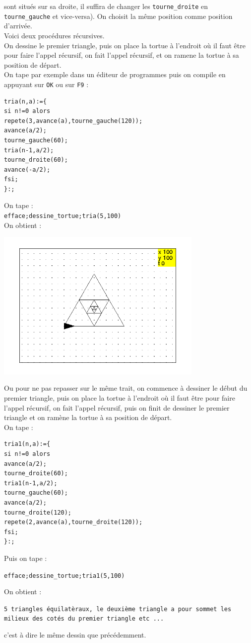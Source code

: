 \documentclass[a4paper,11pt]{book}
\begin{document}
sont situ\'es sur sa droite, il suffira de changer les {\tt tourne\_droite} en
{\tt tourne\_gauche} et vice-versa). On choisit la m\^eme position comme 
position d'arriv\'ee.\\
Voici deux proc\'edures r\'ecursives.\\
On dessine le premier triangle, puis on place la tortue \`a l'endroit o\`u il
faut \^etre pour faire l'appel r\'ecursif, on fait l'appel r\'ecursif,
et on ramene la tortue \`a sa position de d\'epart.\\
On tape par exemple dans un \'editeur de programmes puis on compile en appuyant
sur {\tt OK} ou sur {\tt F9} :
\begin{verbatim}
tria(n,a):={
si n!=0 alors 
repete(3,avance(a),tourne_gauche(120));
avance(a/2);
tourne_gauche(60);
tria(n-1,a/2);
tourne_droite(60);
avance(-a/2);
fsi;
}:;
\end{verbatim}
On tape :\\
{\tt efface;dessine\_tortue;tria(5,100)}\\
On obtient :
\begin{center}\includegraphics[width=10cm]{tortuet}\end{center}

Ou pour ne pas repasser sur le m\^eme trait, on commence \`a dessiner le 
d\'ebut du premier triangle, puis on place la tortue \`a l'endroit o\`u il faut
\^etre pour faire l'appel r\'ecursif,  on fait l'appel r\'ecursif, puis on 
finit de dessiner le premier triangle et on ram\`ene la tortue \`a sa position 
de d\'epart.\\
On tape :
\begin{verbatim} 
tria1(n,a):={
si n!=0 alors
avance(a/2);
tourne_droite(60);
tria1(n-1,a/2);
tourne_gauche(60);
avance(a/2);
tourne_droite(120);
repete(2,avance(a),tourne_droite(120));
fsi;
}:;
\end{verbatim}
Puis on tape :
\begin{center}{\tt efface;dessine\_tortue;tria1(5,100)}\end{center}
On obtient :
\begin{center}{\tt 5 triangles \'equilat\`eraux, le deuxi\`eme triangle a pour sommet les milieux des cot\'es du premier triangle etc ...}\end{center}
c'est \`a dire le m\^eme dessin que pr\'ec\'edemment.
\end{document}

